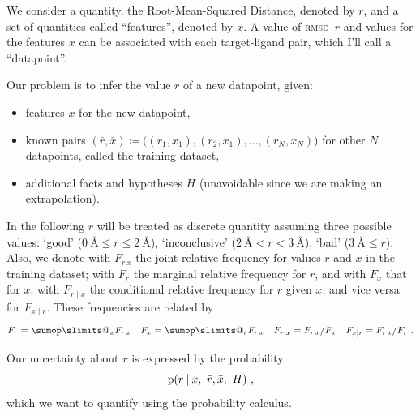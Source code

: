 \documentclass[\ifafour a4paper,12pt,\else a5paper,10pt,\fi%
onecolumn,oneside,article,%
british%
]{memoir}
\makeatletter
\theoremstyle{remark}
\theoremstyle{innote}
\def\sum{\DOTSI\sumop\slimits@}
\newcommand*{\defd}{\coloneqq}
\renewcommand*{\le}{\leqslant}%
\newcommand*{\p}{\mathrm{p}}%
\renewcommand*{\|}[1][]{\nonscript\:#1\vert\nonscript\:\mathopen{}}
\renewcommand*{\=}{\TextOrMath\texteq\eq}
\newcommand*{\rmsd}{\textsc{rmsd}}
\newcommand*{\ro}{r}
\newcommand*{\xo}{x}
\newcommand*{\br}{\bar{r}}
\newcommand*{\bx}{\bar{x}}
\newcommand*{\q}{}%
\DeclareRobustCommand*{\q}{%
  \mathord{\mathpalette\bigcdot@{}}%
}
\newcommand*{\bigcdot@scalefactor}{0.7}
\newcommand*{\bigcdot@widthfactor}{1.5}
\newcommand*{\bigcdot@}[2]{%
  \sbox0{$#1\vcenter{}$}%
  \sbox2{$#1\cdot\m@th$}%
  \hbox to \bigcdot@widthfactor\wd2{%
    \hfil
    \raise\ht0\hbox{%
      \scalebox{\bigcdot@scalefactor}{%
        \lower\ht0\hbox{$#1\bullet\m@th$}%
      }%
    }%
    \hfil
  }%
}
\makeatother
\begin{document}
We consider a quantity, the Root-Mean-Squared Distance, denoted by $r$, and
a set of quantities called \enquote{features}, denoted by $x$. A
value of \rmsd\ $r$
and values for the  features $x$ can be associated with each target-ligand
pair, which I'll call a \enquote{datapoint}.

Our problem is to infer the value $\ro$ of a new datapoint, given:
\begin{itemize}
\item features $\xo$ for the new datapoint,
\item known pairs
  $(\br,\bx) \defd \bigl((r_{1}, x_{1}), (r_{2}, x_{1}), \dotsc, (r_{N},
  x_{N})\bigr)$ for other $N$ datapoints, called the training dataset,
\item additional facts and hypotheses $H$ (unavoidable since we are making an
extrapolation).
\end{itemize}

In the following $r$ will be treated as discrete quantity assuming three
possible values: \enquote*{good}
($0\ \textrm{\AA}\le r \le 2\ \textrm{\AA}$), \enquote*{inconclusive}
($2\ \textrm{\AA} < r < 3\ \textrm{\AA}$), \enquote*{bad}
($3\ \textrm{\AA} \le r$). Also, we denote with $F_{r\, x}$ the joint
relative frequency for values $r$ and $x$ in the training dataset; with
$F_{r\q}$ the marginal relative frequency for $r$, and with $F_{\q x}$ that
for $x$; with $F_{r\mid x}$ the conditional relative frequency for $r$
given $x$, and vice versa for $F_{x \mid r}$. These frequencies are related
by
\begin{equation}
  \label{eq:frequencies_relations}
  F_{r\q}=\sum_{x} F_{r\,x} \quad
  F_{\q x}=\sum_{r} F_{r\,x}\quad
  F_{r\mid x}=F_{r\,x}/F_{\q x} \quad
  F_{x\mid r}=F_{r\,x}/F_{r\q}\ .
\end{equation}


Our uncertainty about $\ro$ is expressed by the probability
\begin{equation}
  \label{eq:main_prob}
  \p(\ro \| \xo,\ \br,\bx,\ H) \ ,
\end{equation}
which we want to quantify using the probability calculus.
\end{document}
